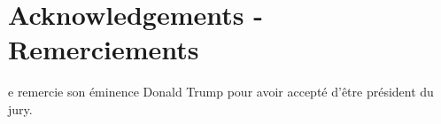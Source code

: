 \chapter*{Acknowledgements - Remerciements}
e remercie son éminence Donald Trump pour avoir accepté d'être
président du jury.
